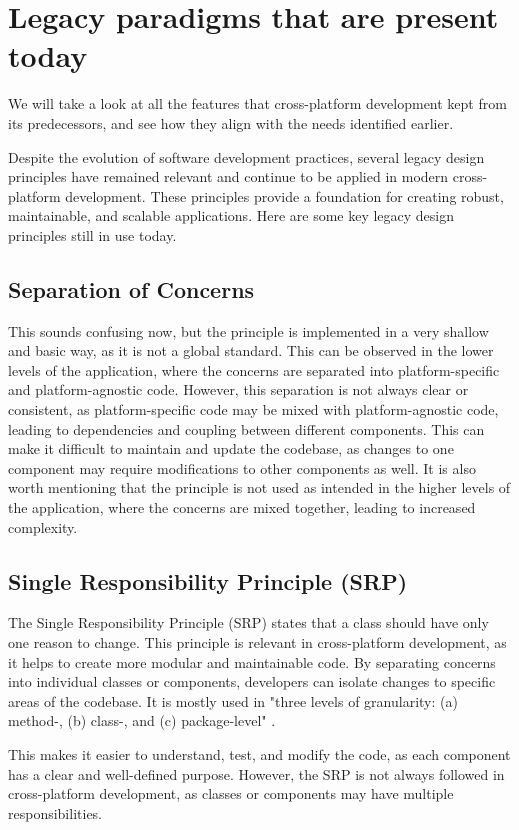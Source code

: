 \section{Legacy paradigms that are present today}
We will take a look at all the features that cross-platform development kept from its predecessors, and see how they align with the needs identified earlier.

\par
Despite the evolution of software development practices, several legacy design principles have remained relevant and continue to be applied in modern cross-platform development. 
These principles provide a foundation for creating robust, maintainable, and scalable applications. 
Here are some key legacy design principles still in use today.

\subsection{Separation of Concerns} 
This sounds confusing now, but the principle is implemented in a very shallow and basic way, as it is not a global standard.
This can be observed in the lower levels of the application, where the concerns are separated into platform-specific and platform-agnostic code.
However, this separation is not always clear or consistent, as platform-specific code may be mixed with platform-agnostic code, leading to dependencies and coupling between different components.
This can make it difficult to maintain and update the codebase, as changes to one component may require modifications to other components as well.
It is also worth mentioning that the principle is not used as intended in the higher levels of the application, where the concerns are mixed together, leading to increased complexity.

\subsection{Single Responsibility Principle (SRP)}
The Single Responsibility Principle (SRP) states that a class should have only one reason to change.
This principle is relevant in cross-platform development, as it helps to create more modular and maintainable code.
By separating concerns into individual classes or components, developers can isolate changes to specific areas of the codebase.
It is mostly used in "three levels of granularity: (a) method-, (b) class-, and (c) package-level" \cite{srp}.
\par
This makes it easier to understand, test, and modify the code, as each component has a clear and well-defined purpose.
However, the SRP is not always followed in cross-platform development, as classes or components may have multiple responsibilities.


